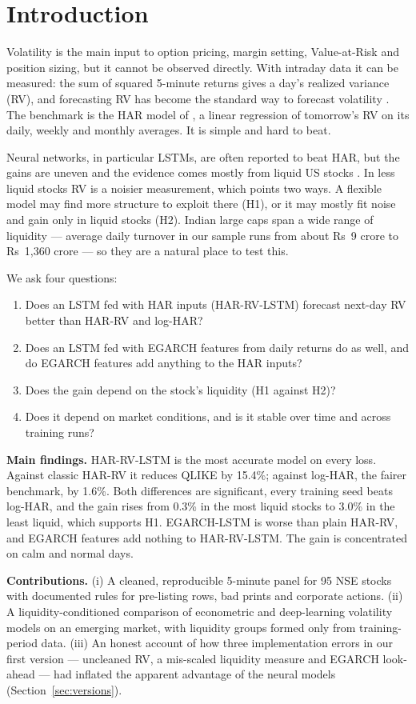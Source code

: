\section{Introduction}

Volatility is the main input to option pricing, margin setting, Value-at-Risk and position sizing,
but it cannot be observed directly. With intraday data it can be measured: the sum of squared 5-minute
returns gives a day's realized variance (RV), and forecasting RV has become the standard way to forecast
volatility \citep{andersen2003}. The benchmark is the HAR model of \citet{corsi2009}, a linear
regression of tomorrow's RV on its daily, weekly and monthly averages. It is simple and hard to beat.

Neural networks, in particular LSTMs, are often reported to beat HAR, but the gains are uneven and
the evidence comes mostly from liquid US stocks \citep{bucci2020,rahimikia2020,christensen2023}.
In less liquid stocks RV is a noisier measurement, which points two ways. A flexible model may find more
structure to exploit there (H1), or it may mostly fit noise and gain only in liquid stocks (H2).
Indian large caps span a wide range of liquidity --- average daily turnover in our sample runs from
about Rs~9 crore to Rs~1,360 crore --- so they are a natural place to test this.

We ask four questions:
\begin{enumerate}
\item Does an LSTM fed with HAR inputs (HAR-RV-LSTM) forecast next-day RV better than HAR-RV and log-HAR?
\item Does an LSTM fed with EGARCH features from daily returns do as well, and do EGARCH features add
anything to the HAR inputs?
\item Does the gain depend on the stock's liquidity (H1 against H2)?
\item Does it depend on market conditions, and is it stable over time and across training runs?
\end{enumerate}

\textbf{Main findings.} HAR-RV-LSTM is the most accurate model on every loss. Against classic HAR-RV it
reduces QLIKE by 15.4\%; against log-HAR, the fairer benchmark, by 1.6\%. Both differences are
significant, every training seed beats log-HAR, and the gain rises from 0.3\% in the most liquid stocks to
3.0\% in the least liquid, which supports H1. EGARCH-LSTM is worse than plain HAR-RV, and EGARCH features
add nothing to HAR-RV-LSTM. The gain is concentrated on calm and normal days.

\textbf{Contributions.} (i) A cleaned, reproducible 5-minute panel for 95 NSE stocks with documented
rules for pre-listing rows, bad prints and corporate actions. (ii) A liquidity-conditioned comparison
of econometric and deep-learning volatility models on an emerging market, with liquidity groups formed
only from training-period data. (iii) An honest account of how three implementation errors in our
first version --- uncleaned RV, a mis-scaled liquidity measure and EGARCH look-ahead --- had inflated
the apparent advantage of the neural models (Section~\ref{sec:versions}).
